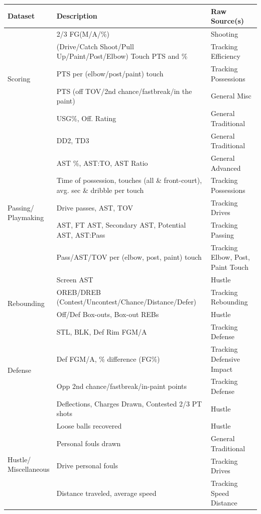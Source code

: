 \begin{tabular}{p{1.5cm}p{8.5cm}p{4cm}}
\toprule
Dataset & Description & Raw Source(s) \\
\midrule
\multirow{5}{*}{Scoring} 
    & 2/3 FG(M/A/\%) & Shooting \\
    & (Drive/Catch Shoot/Pull Up/Paint/Post/Elbow) Touch PTS and \% & Tracking Efficiency \\
    & PTS per (elbow/post/paint) touch & Tracking Possessions \\
    & PTS (off TOV/2nd chance/fastbreak/in the paint) & General Misc \\
    & USG\%, Off. Rating & General Traditional \\
    & DD2, TD3 & General Traditional \\
\midrule
\multirow{5}{*}{\parbox{2cm}{Passing/\\Playmaking}} 
    & AST \%, AST:TO, AST Ratio & General Advanced \\
    & Time of possession, touches (all \& front-court), avg. sec \& dribble per touch & Tracking Possessions \\
    & Drive passes, AST, TOV & Tracking Drives \\
    & AST, FT AST, Secondary AST, Potential AST, AST:Pass & Tracking Passing \\
    & Pass/AST/TOV per (elbow, post, paint) touch & Tracking Elbow, Post, Paint Touch \\
    & Screen AST & Hustle \\
\midrule
\multirow{2}{*}{Rebounding} 
    & OREB/DREB (Contest/Uncontest/Chance/Distance/Defer) & Tracking Rebounding \\
    & Off/Def Box-outs, Box-out REBs & Hustle \\
\midrule
\multirow{4}{*}{Defense} 
    & STL, BLK, Def Rim FGM/A & Tracking Defense \\
    & Def FGM/A, \% difference (FG\%) & Tracking Defensive Impact \\
    & Opp 2nd chance/fastbreak/in-paint points & Tracking Defense \\
    & Deflections, Charges Drawn, Contested 2/3 PT shots & Hustle \\
\midrule
\multirow{4}{*}{\parbox{2cm}{Hustle/\\Miscellaneous}} 
    & Loose balls recovered & Hustle \\
    & Personal fouls drawn & General Traditional \\
    & Drive personal fouls & Tracking Drives \\
    & Distance traveled, average speed & Tracking Speed Distance \\
\bottomrule
\end{tabular}
